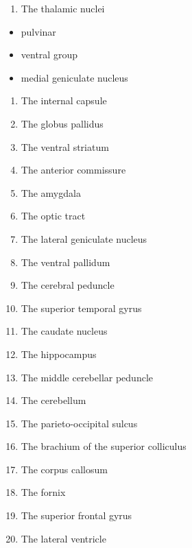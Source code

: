\documentclass[]{book}
\providecommand{\tightlist}{%
  \setlength{\itemsep}{0pt}\setlength{\parskip}{0pt}}
\begin{document}
\begin{enumerate}
\def\labelenumi{\arabic{enumi}.}
\tightlist
\item
  The thalamic nuclei
\end{enumerate}

\begin{itemize}
\tightlist
\item
  pulvinar
\item
  ventral group
\item
  medial geniculate nucleus
\end{itemize}

\begin{enumerate}
\def\labelenumi{\arabic{enumi}.}
\tightlist
\item
  The internal capsule
\item
  The globus pallidus
\item
  The ventral striatum
\item
  The anterior commissure
\item
  The amygdala
\item
  The optic tract
\item
  The lateral geniculate nucleus
\item
  The ventral pallidum
\item
  The cerebral peduncle
\item
  The superior temporal gyrus
\item
  The caudate nucleus
\item
  The hippocampus
\item
  The middle cerebellar peduncle
\item
  The cerebellum
\item
  The parieto-occipital sulcus
\item
  The brachium of the superior colliculus
\item
  The corpus callosum
\item
  The fornix
\item
  The superior frontal gyrus
\item
  The lateral ventricle
\end{enumerate}
\end{document}
